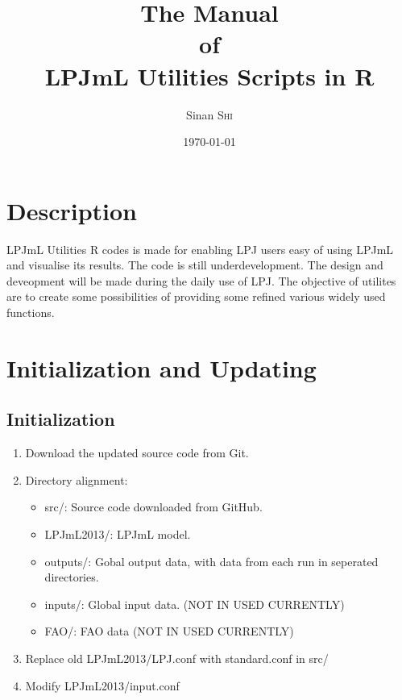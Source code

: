 \documentclass{article}
\title{The Manual\\of\\LPJmL Utilities Scripts in R} %
\author{Sinan \textsc{Shi}} %
\date{\today} %
\begin{document}
\maketitle %
\tableofcontents
\pagebreak

\section{Description}
LPJmL Utilities R codes is made for enabling LPJ users easy of using LPJmL and visualise its results.
The code is still underdevelopment. The design and deveopment will be made during the daily use of LPJ. The objective of utilites are to create some possibilities of providing 
some refined various widely used functions.

\pagebreak
\section{Initialization and Updating}
\subsection{Initialization}
\begin{enumerate}
\item Download the updated source code from Git.
\item Directory alignment:
   \begin{itemize}
   \item src/: Source code downloaded from GitHub.
   \item LPJmL2013/: LPJmL model.
   \item outputs/: Gobal output data, with data from each run in seperated directories. 
   \item inputs/: Global input data. (NOT IN USED CURRENTLY)
   \item FAO/: FAO data (NOT IN USED CURRENTLY)
   \end{itemize}
\item Replace old LPJmL2013/LPJ.conf with standard.conf in src/
\item Modify LPJmL2013/input.conf 
\end{enumerate}
\end{document}
